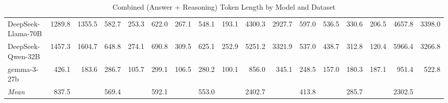 \begin{table}[ht]
{\begin{tabular}{l r r r r r r r r r r r r r r r r}
      DeepSeek-Llama-70B & 1289.8 & 1355.5 & 582.7 & 253.3 & 622.0 & 267.1 & 548.1 & 193.1 & 4300.3 & 2927.7 & 597.0 & 536.5 & 330.6 & 206.5 & 4657.8 & 3398.0 \\
      DeepSeek-Qwen-32B & 1457.3 & 1604.7 & 648.8 & 274.1 & 690.8 & 309.5 & 625.1 & 252.9 & 5251.2 & 3321.9 & 537.0 & 438.7 & 312.8 & 120.4 & 5966.4 & 3266.8 \\
      gemma-3-27b & 426.1 & 183.6 & 286.7 & 105.7 & 299.1 & 106.5 & 280.2 & 100.1 & 856.0 & 345.1 & 248.5 & 157.0 & 180.3 & 187.1 & 951.4 & 522.8 \\
      \midrule
      \textit{Mean} & 837.5 &  & 569.4 &  & 592.1 &  & 553.0 &  & 2402.7 &  & 413.8 &  & 285.7 &  & 2302.5 &  \\
      \bottomrule
    \end{tabular}%
  }
  \caption{Combined (Answer + Reasoning) Token Length by Model and Dataset}
\end{table}